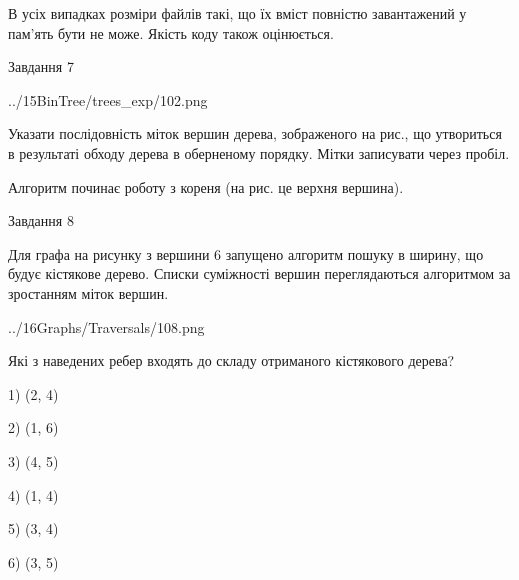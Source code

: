 \documentclass[12pt, ukrainian]{article}
\begin{document}
{В усіх випадках розміри файлів такі, що їх вміст повністю завантажений у пам'ять бути не може. Якість коду також оцінюється.



\vspace{10mm}\par

\newpage
\begin{minipage}[t]{9.7cm}
               
{\begin{center}Завдання {7}\end{center}}
\vspace{-4mm}

\begin{center}
	{../15BinTree/trees_exp/102.png}
\end{center}
Указати послідовність міток вершин дерева, зображеного на рис., що утвориться в результаті обходу дерева в оберненому порядку. Мітки записувати через пробіл.\par Алгоритм починає роботу з кореня (на рис. це верхня вершина).\par

\end{minipage}
\vline \hspace{8mm}
\begin{minipage}[t]{8.0cm}
               
{\begin{center}Завдання {8}\end{center}}
\vspace{-4mm}
Для графа на рисунку з вершини 6 запущено алгоритм пошуку в ширину, що будує кістякове дерево. Списки суміжності вершин переглядаються алгоритмом за зростанням міток вершин.\par
\begin{center}
	{../16Graphs/Traversals/108.png}
\end{center}
\par Які з наведених ребер входять до складу отриманого кістякового дерева?\par
1) (2, 4)\par
2) (1, 6)\par
3) (4, 5)\par
4) (1, 4)\par
5) (3, 4)\par
6) (3, 5)\par
{\vskip 15pt} \par


\end{minipage}}
\end{document}
